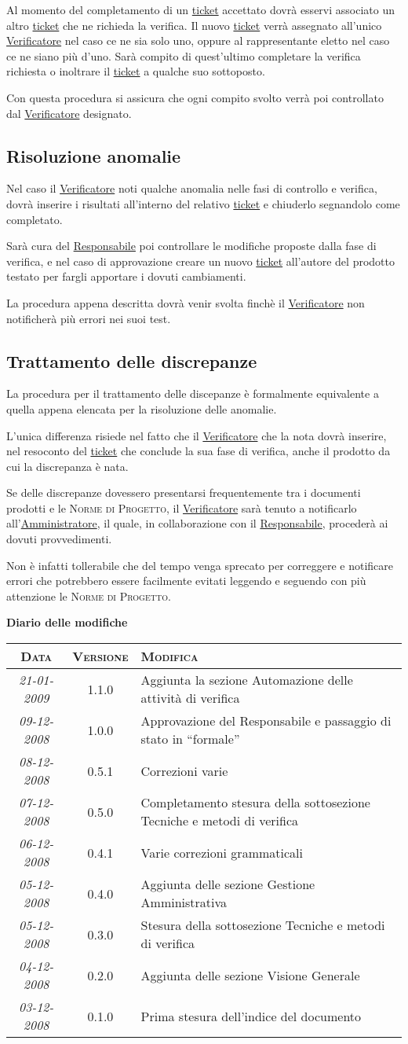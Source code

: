 \documentclass[11pt,a4paper]{article}
\newcommand{\modifiche} 
{
\newpage
\begin{center}
\textbf{Diario delle modifiche} \\
\bigskip
\begin{tabular}{|c|c|p{0.51\textwidth}|}
\hline
\textsc{Data} & \textsc{Versione} & \textsc{Modifica} \\
\hline
\hline
\textit{21-01-2009} & 1.1.0 & Aggiunta la sezione Automazione delle attività di verifica  \\
\hline
\textit{09-12-2008} & 1.0.0 & Approvazione del Responsabile e passaggio di stato in ``formale''  \\
\hline
\textit{08-12-2008} & 0.5.1 & Correzioni varie  \\
\hline
\textit{07-12-2008} & 0.5.0 & Completamento stesura della sottosezione Tecniche e metodi di verifica  \\
\hline
\textit{06-12-2008} & 0.4.1 & Varie correzioni grammaticali  \\
\hline
\textit{05-12-2008} & 0.4.0 & Aggiunta delle sezione Gestione Amministrativa  \\
\hline
\textit{05-12-2008} & 0.3.0 & Stesura della sottosezione Tecniche e metodi di verifica  \\
\hline
\textit{04-12-2008} & 0.2.0 & Aggiunta delle sezione Visione Generale  \\
\hline
\textit{03-12-2008} & 0.1.0 & Prima stesura dell'indice del documento \\
\hline
\end{tabular}
\end{center}
}
\begin{document}
Al momento del completamento di un \underline{ticket} accettato dovrà esservi associato un altro \underline{ticket} che ne richieda la verifica. Il nuovo \underline{ticket} verrà assegnato all'unico \underline{Verificatore} nel caso ce ne sia solo uno, oppure al rappresentante eletto nel caso ce ne siano più d'uno. Sarà compito di quest'ultimo completare la verifica richiesta o inoltrare il \underline{ticket} a qualche suo sottoposto.

Con questa procedura si assicura che ogni compito svolto verrà poi controllato dal \underline{Verificatore} designato.
\subsection{Risoluzione anomalie}
Nel caso il \underline{Verificatore} noti qualche anomalia nelle fasi di controllo e verifica, dovrà inserire i risultati all'interno del relativo \underline{ticket} e chiuderlo segnandolo come completato.

Sarà cura del \underline{Responsabile} poi controllare le modifiche proposte dalla fase di verifica, e nel caso di approvazione creare un nuovo \underline{ticket} all'autore del prodotto testato per fargli apportare i dovuti cambiamenti.

La procedura appena descritta dovrà venir svolta finchè il \underline{Verificatore} non notificherà più errori nei suoi test.
\subsection{Trattamento delle discrepanze}
La procedura per il trattamento delle discepanze è formalmente equivalente a quella appena elencata per la risoluzione delle anomalie.

L'unica differenza risiede nel fatto che il \underline{Verificatore} che la nota dovrà inserire, nel resoconto del \underline{ticket} che conclude la sua fase di verifica, anche il prodotto da cui la discrepanza è nata.

Se delle discrepanze dovessero presentarsi frequentemente tra i documenti prodotti e le \textsc{Norme di Progetto}, il \underline{Verificatore} sarà tenuto a notificarlo all'\underline{Amministratore}, il quale, in collaborazione con il \underline{Responsabile}, procederà ai dovuti provvedimenti.

Non è infatti tollerabile che del tempo venga sprecato per correggere e notificare errori che potrebbero essere facilmente evitati leggendo e seguendo con più attenzione le \textsc{Norme di Progetto}.
\modifiche
\end{document}
